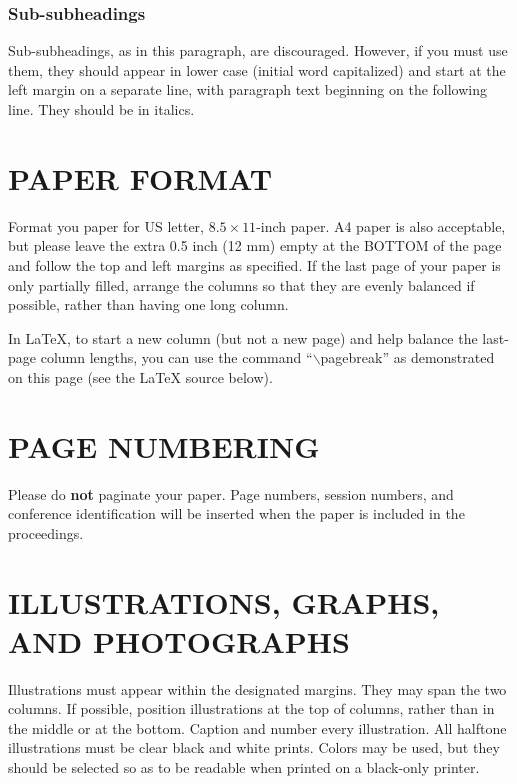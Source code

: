 \documentclass{article}
\begin{document}
\subsubsection{Sub-subheadings}
\label{sssec:subsubhead}

Sub-subheadings, as in this paragraph, are discouraged. However, if you
must use them, they should appear in lower case (initial word
capitalized) and start at the left margin on a separate line, with paragraph
text beginning on the following line.  They should be in italics.

\section{PAPER FORMAT}
\label{sec:print}

Format you paper for US letter, $8.5 \times 11$-inch paper.
A4 paper is also acceptable, but please leave the extra 0.5 inch (12 mm)
empty at the BOTTOM of the page and follow the top and left margins as
specified.  If the last page of your paper is only partially filled, arrange
the columns so that they are evenly balanced if possible, rather than having
one long column.

In LaTeX, to start a new column (but not a new page) and help balance the
last-page column lengths, you can use the command ``$\backslash$pagebreak'' as
demonstrated on this page (see the LaTeX source below).

\section{PAGE NUMBERING}
\label{sec:page}

Please do {\bf not} paginate your paper.  Page numbers, session numbers, and
conference identification will be inserted when the paper is included in the
proceedings.

\section{ILLUSTRATIONS, GRAPHS, AND PHOTOGRAPHS}
\label{sec:illust}

Illustrations must appear within the designated margins.  They may span the two
columns.  If possible, position illustrations at the top of columns, rather
than in the middle or at the bottom.  Caption and number every illustration.
All halftone illustrations must be clear black and white prints.  Colors may be
used, but they should be selected so as to be readable when printed on a
black-only printer.
\end{document}

